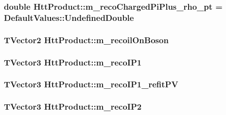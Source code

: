 \hypertarget{classHttProduct_a213a48df02bd0bcf562c3cf636fc6df2}{
\subsubsection[{m\_\-recoChargedPiPlus\_\-rho\_\-pt}]{\setlength{\rightskip}{0pt plus 5cm}double {\bf HttProduct::m\_\-recoChargedPiPlus\_\-rho\_\-pt} = DefaultValues::UndefinedDouble}}
\label{classHttProduct_a213a48df02bd0bcf562c3cf636fc6df2}
\hypertarget{classHttProduct_ab2b4e95415346741761baf7a260e9d07}{
\subsubsection[{m\_\-recoilOnBoson}]{\setlength{\rightskip}{0pt plus 5cm}TVector2 {\bf HttProduct::m\_\-recoilOnBoson}}}
\label{classHttProduct_ab2b4e95415346741761baf7a260e9d07}
\hypertarget{classHttProduct_a571feb2272c3205b12c0bd6e694127d3}{
\subsubsection[{m\_\-recoIP1}]{\setlength{\rightskip}{0pt plus 5cm}TVector3 {\bf HttProduct::m\_\-recoIP1}}}
\label{classHttProduct_a571feb2272c3205b12c0bd6e694127d3}
\hypertarget{classHttProduct_aea4fe73c340c52db4fe5a427d2cf9be5}{
\subsubsection[{m\_\-recoIP1\_\-refitPV}]{\setlength{\rightskip}{0pt plus 5cm}TVector3 {\bf HttProduct::m\_\-recoIP1\_\-refitPV}}}
\label{classHttProduct_aea4fe73c340c52db4fe5a427d2cf9be5}
\hypertarget{classHttProduct_afd8ea5060d1649bdc05b7598a43d3f30}{
\subsubsection[{m\_\-recoIP2}]{\setlength{\rightskip}{0pt plus 5cm}TVector3 {\bf HttProduct::m\_\-recoIP2}}}
